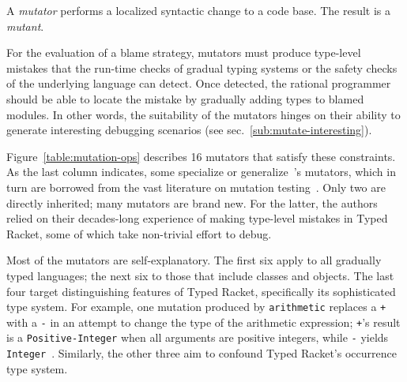 
A {\it mutator\/} performs a localized syntactic change to a code base. The
result is a {\em mutant\/}.

For the evaluation of a blame strategy, mutators must produce type-level
mistakes that the run-time checks of gradual typing systems or the safety
checks of the underlying language can detect. Once detected, the rational
programmer should be able to locate the mistake by gradually adding types
to blamed modules. In other words, the suitability of the mutators hinges
on their ability to generate interesting debugging scenarios (see
sec.~\ref{sub:mutate-interesting}).


Figure~\ref{table:mutation-ops} describes 16 mutators that satisfy these
constraints. As the last column indicates, some specialize or
generalize~\citet{lksfd-popl-2020}'s mutators, which in turn are borrowed from
the vast literature on mutation testing~\cite{jia2011analysis}.  Only two are
directly inherited; many mutators are brand new. For the latter, the authors
relied on their decades-long experience of making type-level mistakes in Typed
Racket, some of which take non-trivial effort to debug.

Most of the mutators are self-explanatory.  The first six apply to all
gradually typed languages; the next six to those that include classes and
objects. The last four target distinguishing features of Typed Racket,
specifically its sophisticated type system. For example, one mutation produced by {\tt arithmetic}
replaces a {\tt +} with a {\tt -} in an attempt to change the type of the
arithmetic expression; {\tt +}'s result is a {\tt Positive-Integer} when all
arguments are positive integers, while {\tt -} yields {\tt
Integer}~\cite{stathff-padl-12}. Similarly, the other three aim to confound
Typed Racket's occurrence type system. 
